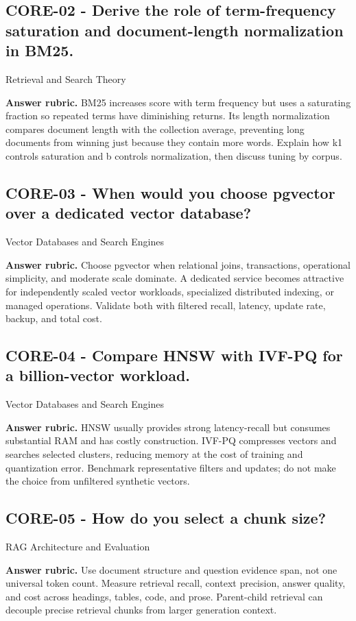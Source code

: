 \subsection*{CORE-02 - Derive the role of term-frequency saturation and document-length normalization in BM25.}
 \quad Retrieval and Search Theory
\par\smallskip\textbf{Answer rubric.} BM25 increases score with term frequency but uses a saturating fraction so repeated terms have diminishing returns. Its length normalization compares document length with the collection average, preventing long documents from winning just because they contain more words. Explain how k1 controls saturation and b controls normalization, then discuss tuning by corpus.
\subsection*{CORE-03 - When would you choose pgvector over a dedicated vector database?}
 \quad Vector Databases and Search Engines
\par\smallskip\textbf{Answer rubric.} Choose pgvector when relational joins, transactions, operational simplicity, and moderate scale dominate. A dedicated service becomes attractive for independently scaled vector workloads, specialized distributed indexing, or managed operations. Validate both with filtered recall, latency, update rate, backup, and total cost.
\subsection*{CORE-04 - Compare HNSW with IVF-PQ for a billion-vector workload.}
 \quad Vector Databases and Search Engines
\par\smallskip\textbf{Answer rubric.} HNSW usually provides strong latency-recall but consumes substantial RAM and has costly construction. IVF-PQ compresses vectors and searches selected clusters, reducing memory at the cost of training and quantization error. Benchmark representative filters and updates; do not make the choice from unfiltered synthetic vectors.
\subsection*{CORE-05 - How do you select a chunk size?}
 \quad RAG Architecture and Evaluation
\par\smallskip\textbf{Answer rubric.} Use document structure and question evidence span, not one universal token count. Measure retrieval recall, context precision, answer quality, and cost across headings, tables, code, and prose. Parent-child retrieval can decouple precise retrieval chunks from larger generation context.
